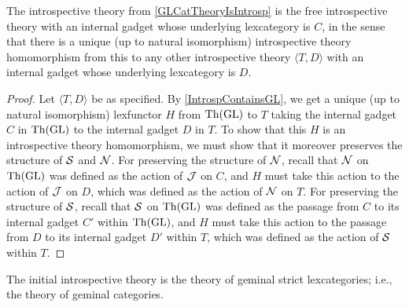 \begin{theorem}
The introspective theory from \cref{GLCatTheoryIsIntrosp} is the free introspective theory with an internal gadget whose underlying lexcategory is $C$, in the sense that there is a unique (up to natural isomorphism) introspective theory homomorphism from this to any other introspective theory $\langle T, D \rangle$ with an internal gadget whose underlying lexcategory is $D$.
\end{theorem}
\begin{proof}
Let $\langle T, D \rangle$ be as specified. By \cref{IntrospContainsGL}, we get a unique (up to natural isomorphism) lexfunctor $H$ from $\mathrm{Th}(\mathrm{GL})$ to $T$ taking the internal gadget $C$ in $\mathrm{Th}(\mathrm{GL})$ to the internal gadget $D$ in $T$. To show that this $H$ is an introspective theory homomorphism, we must show that it moreover preserves the structure of $\mathcal{S}$ and $\mathcal{N}$. For preserving the structure of $\mathcal{N}$, recall that $\mathcal{N}$ on $\mathrm{Th}(\mathrm{GL})$ was defined as the action of $\mathcal{J}$ on $C$, and $H$ must take this action to the action of $\mathcal{J}$ on $D$, which was defined as the action of $\mathcal{N}$ on $T$. For preserving the structure of $\mathcal{S}$, recall that $\mathcal{S}$ on $\mathrm{Th}(\mathrm{GL})$ was defined as the passage from $C$ to its internal gadget $C'$ within $\mathrm{Th}(\mathrm{GL})$, and $H$ must take this action to the passage from $D$ to its internal gadget $D'$ within $T$, which was defined as the action of $\mathcal{S}$ within $T$.
\end{proof}
\begin{corollary}
The initial introspective theory is the theory of geminal strict lexcategories; i.e., the theory of geminal categories.
\end{corollary}


